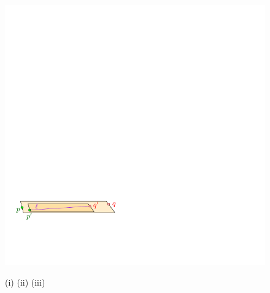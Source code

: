 \documentclass[12pt]{article}%
\begin{document}
\begin{figure}[h]
    \hfill%
    \includegraphics[page=3]{figs/narrow_trap}%
    \hfill\phantom{}%

    \phantom{}\hfill%
    (i)\qquad\qquad\qquad \hfill%
    (ii) \hfill%
    \qquad \qquad \qquad(iii) \hfill\phantom{}%

    \caption{}
\end{figure}
\end{document}
